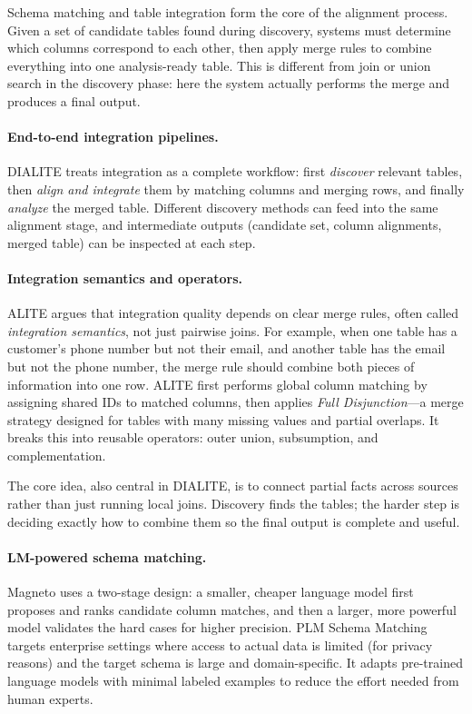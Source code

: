\documentclass[sigconf]{acmart}
\begin{document}
Schema matching and table integration form the core of the alignment process. Given a set of candidate tables found during discovery, systems must determine which columns correspond to each other, then apply merge rules to combine everything into one analysis-ready table. This is different from join or union search in the discovery phase: here the system actually performs the merge and produces a final output.

\paragraph{End-to-end integration pipelines.}
DIALITE treats integration as a complete workflow: first \emph{discover} relevant tables, then \emph{align and integrate} them by matching columns and merging rows, and finally \emph{analyze} the merged table. Different discovery methods can feed into the same alignment stage, and intermediate outputs (candidate set, column alignments, merged table) can be inspected at each step.

\paragraph{Integration semantics and operators.}
ALITE argues that integration quality depends on clear merge rules, often called \emph{integration semantics}, not just pairwise joins. For example, when one table has a customer's phone number but not their email, and another table has the email but not the phone number, the merge rule should combine both pieces of information into one row. ALITE first performs global column matching by assigning shared IDs to matched columns, then applies \emph{Full Disjunction}---a merge strategy designed for tables with many missing values and partial overlaps. It breaks this into reusable operators: outer union, subsumption, and complementation.

The core idea, also central in DIALITE, is to connect partial facts across sources rather than just running local joins. Discovery finds the tables; the harder step is deciding exactly how to combine them so the final output is complete and useful.

\paragraph{LM-powered schema matching.}
Magneto uses a two-stage design: a smaller, cheaper language model first proposes and ranks candidate column matches, and then a larger, more powerful model validates the hard cases for higher precision. PLM Schema Matching targets enterprise settings where access to actual data is limited (for privacy reasons) and the target schema is large and domain-specific. It adapts pre-trained language models with minimal labeled examples to reduce the effort needed from human experts.
\end{document}
